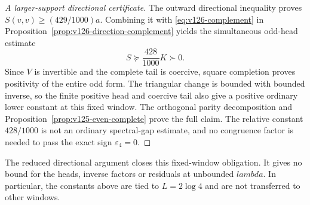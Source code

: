 \documentclass[11pt]{article}
\def\lambda{lambda}%
\theoremstyle{remark}
\begin{document}
\begin{proof}[A larger-support directional certificate]
The outward directional inequality proves
$S(v,v)\ge(429/1000)a$. Combining it with
\eqref{eq:v126-complement} in
Proposition~\ref{prop:v126-direction-complement} yields the
simultaneous odd-head estimate
\begin{equation}\label{eq:v126-odd-relative-margin}
 S\succeq\frac{428}{1000}K\succ0.
\end{equation}
Since $V$ is invertible and the complete tail is coercive,
square completion proves positivity of the entire odd form.
The triangular change is bounded with bounded inverse, so the
finite positive head and coercive tail also give a positive
ordinary lower constant at this fixed window. The orthogonal
parity decomposition and Proposition~\ref{prop:v125-even-complete}
prove the full claim. The relative constant $428/1000$ is not
an ordinary spectral-gap estimate, and no congruence factor is
needed to pass the exact sign $\varepsilon_4=0$.
\end{proof}

The reduced directional argument closes this fixed-window obligation.
It gives no bound for the heads, inverse factors or residuals at
unbounded $\lambda$. In particular, the constants above are tied
to $L=2\log4$ and are not transferred to other windows.

\end{document}
